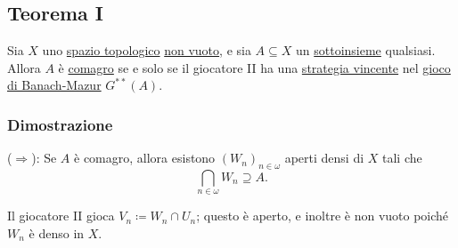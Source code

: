 \documentclass{article}
\newcommand{\1}{\mathds{1}}
\begin{document}
\subsection{Teorema I}
\label{sec:org5e232d7}

Sia \(X\) uno \href{../../../../../../../org/roam/20250103145124-topologia.org}{spazio topologico} \href{../../../../../../../org/roam/20250131161811-insieme_vuoto_mk.org}{non vuoto}, e sia \(A \subseteq X\) un \href{../../../../../../../org/roam/20250131155822-operazioni_insiemistiche_tra_classi_mk.org}{sottoinsieme} qualsiasi. Allora \(A\) è \href{../../../../../../../org/roam/20250419122752-insieme_magro.org}{comagro} se e solo se il giocatore II ha una \hyperref[sec:org1db90c5]{strategia vincente} nel \hyperref[sec:orge8e0b9e]{gioco di Banach-Mazur} \(G^{**}(A)\).
\subsubsection{Dimostrazione}
\label{sec:org3046cd1}

(\(\Rightarrow\)): Se \(A\) è comagro, allora esistono \((W_{n})_{n \in\omega}\) aperti densi di \(X\) tali che
\begin{equation*}
\bigcap_{n \in\omega} W_{n} \supseteq A.
\end{equation*}

Il giocatore II gioca \(V_{n} \coloneqq W_{n}\cap U_{n}\); questo è aperto, e inoltre è non vuoto poiché \(W_{n}\) è denso in \(X\).
\end{document}

